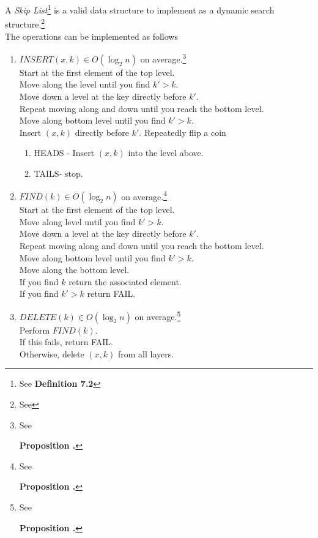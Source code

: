 \documentclass[11pt,a4paper]{article}
\begin{document}
A \textit{Skip List}\footnote{See \textbf{Definition 7.2}} is a valid data structure to implement as a dynamic search structure.\footnote{See {}}\\
The operations can be implemented as follows
\begin{enumerate}
	\item $INSERT(x,k)\in O(\log_2n)$ on average.\footnote{See \addtocounter{proposition}{2}\textbf{Proposition .}\addtocounter{proposition}{-2}}\\
	Start at the first element of the top level.\\
	Move along the level until you find $k'>k$.\\
	Move down a level at the key directly before $k'$.\\
	Repeat moving along and down until you reach the bottom level.\\
	Move along bottom level until you find $k'>k$.\\
	Insert $(x,k)$ directly before $k'$.
	Repeatedly flip a coin
	\begin{enumerate}
		\item HEADS - Insert $(x,k)$ into the level above.
		\item TAILS- stop.
	\end{enumerate}
	\item $FIND(k)\in O(\log_2n)$ on average.\footnote{See \addtocounter{proposition}{2}\textbf{Proposition .}\addtocounter{proposition}{-2}}\\
	Start at the first element of the top level.\\
	Move  along level until you find $k'>k$.\\
	Move down a level at the key directly before $k'$.\\
	Repeat moving along and down until you reach the bottom level.\\
	Move along bottom level until you find $k'>k$.\\
	Move along the bottom level.\\
	If you find $k$ return the associated element.\\
	If you find $k'>k$ return FAIL.
	\newpage
	\item $DELETE(k)\in O(\log_2n)$ on average.\footnote{See \addtocounter{proposition}{2}\textbf{Proposition .}\addtocounter{proposition}{-2}}\\
	Perform $FIND(k)$.\\
	If this fails, return FAIL.\\
	Otherwise, delete $(x,k)$ from all layers.
\end{enumerate}
\end{document}
